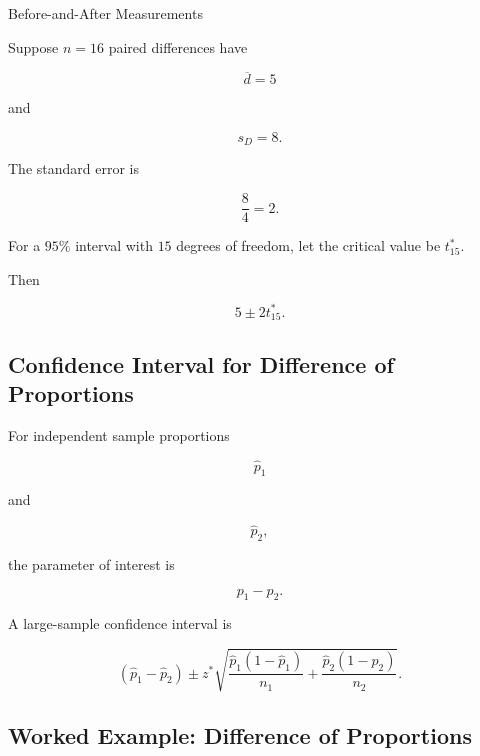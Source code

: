 \begin{workedexamplebox}{Before-and-After Measurements}

Suppose \(n=16\) paired differences have

\[
\overline{d}=5
\]

and

\[
s_D=8.
\]

The standard error is

\[
\frac8{4}=2.
\]

For a \(95\%\) interval with \(15\) degrees of freedom, let the critical
value be \(t^*_{15}\).

Then

\begin{answerbox}
\[
\boxed{
5
\pm
2t^*_{15}.
}
\]
\end{answerbox}

\end{workedexamplebox}

\subsection{Confidence Interval for Difference of Proportions}
\label{subsec:ci-difference-proportions}

For independent sample proportions

\[
\widehat{p}_1
\]

and

\[
\widehat{p}_2,
\]

the parameter of interest is

\[
p_1-p_2.
\]

A large-sample confidence interval is

\[
\boxed{
(\widehat{p}_1-\widehat{p}_2)
\pm
z^*
\sqrt{
\frac{
\widehat{p}_1(1-\widehat{p}_1)
}{
n_1
}
+
\frac{
\widehat{p}_2(1-\widehat{p}_2)
}{
n_2
}
}.
}
\]

\subsection{Worked Example: Difference of Proportions}
\label{subsec:worked-difference-proportions-ci}

